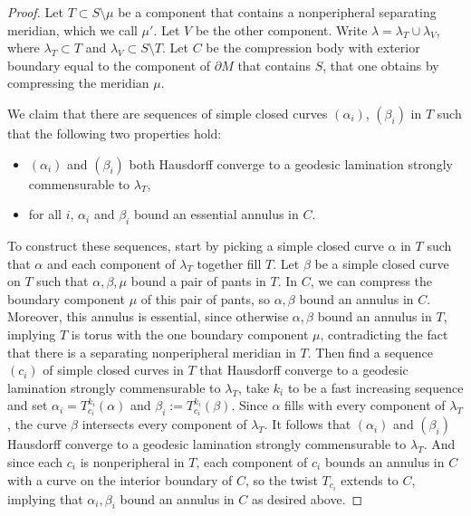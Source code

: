 \documentclass[12pt]{amsart}
\theoremstyle{definition}
\theoremstyle{remark}
\begin{document}
\begin{proof}
Let $T \subset S \setminus \mu$ be a component that contains a nonperipheral separating meridian, which we  call $\mu'$. Let $V$ be the other component. Write $\lambda = \lambda_T \cup \lambda_{V}$, where $\lambda_T\subset T$ and $\lambda_{V} \subset S \setminus T$. Let $C$ be the compression body with exterior boundary equal to the component of $\partial M$ that contains $S$, that one obtains by compressing the meridian $\mu$. 

We claim that there are sequences of simple closed curves $(\alpha_i)$, $(\beta_i)$ in $T$ such that the following two properties hold:
\begin{itemize}
\item $(\alpha_i)$ and $(\beta_i)$ both Hausdorff converge to { a geodesic lamination strongly commensurable to} $\lambda_T$,
\item for all $i$, $\alpha_i$ and $\beta_i$ bound an essential annulus in $C$.
\end{itemize}
To construct these sequences, start by picking a simple closed curve $\alpha$ in $T$ such that $\alpha$ and each component of $\lambda_T$ together fill $T$. Let $\beta$ be a simple closed curve on  $T$ such that $\alpha, \beta,\mu$ bound a pair of pants in $T$.  In $C$, we can compress the boundary component $\mu$ of this pair of pants, so $\alpha,\beta$ bound an annulus in $C$. Moreover, this annulus is essential, since otherwise $\alpha,\beta$ bound an annulus in $T$, implying $T$ is torus with the one boundary component $\mu$, contradicting the fact that there is a separating nonperipheral meridian in $T$. Then find a sequence $(c_i)$ of simple closed curves in $T$ that Hausdorff converge to { a geodesic lamination strongly commensurable to} $\lambda_T$, take $k_i$ to be a fast increasing sequence and set $\alpha_i=T_{c_i}^{k_i}(\alpha)$ and $\beta_i:=T_{c_i}^{k_i}(\beta)$. Since $\alpha $ fills with every component of $\lambda_T$, the curve $\beta$ intersects every component of $\lambda_T$. It follows that  $(\alpha_i)$ and $(\beta_i)$ Hausdorff converge to { a geodesic lamination strongly commensurable to} $\lambda_T$. And since each $c_i$ is nonperipheral in $T$, each component of $c_i$ bounds an annulus in $C$ with a curve on the interior boundary of $C$, so the twist $T_{c_i}$ extends to $C$, implying that $\alpha_i,\beta_i$ bound an annulus in $C$ as desired above.



\end{proof}
\end{document}
